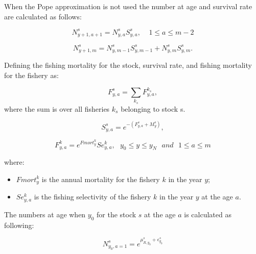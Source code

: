 \documentclass{article}
\begin{document}
When the Pope approximation is not used the number at age and survival rate are calculated as follows:

\begin{equation}
N^s_{y+1,a+1}=N^s_{y,a}S^s_{y,a}, \ \ \ \ \ 1\leq a \leq m-2
\end{equation}

\begin{equation}
N^s_{y+1,m}=N^s_{y,m-1}S^s_{y,m-1}+N^s_{y,m}S^s_{y,m}.
\end{equation}

Defining the fishing mortality for the stock, survival rate, and fishing mortality for the fishery as:

\begin{equation}
F^s_{y,a} = \sum_{k_s}F^{k_s}_{y,a}, 
\end{equation}
where the sum is over all fisheries $k_s$ belonging to stock s.

\begin{equation}
S^s_{y,a}=e^{-(F^s_{y,a}+M^{s}_{y})},
\end{equation}

\begin{equation}
F^k_{y,a}=e^{Fmort^k_y}Se^k_{y,a}, \ \ \ y_0\leq y \leq y_N \ \ \ and  \ \ \  1\leq a \leq m
\end{equation}

where:
\begin{itemize}

    
    \item $Fmort^k_y$ is the annual mortality for the fishery $k$ in the year $y$;
    \item $Se^k_{y,a}$ is the fishing selectivity of the fishery $k$ in the year $y$ at the age $a$.

\end{itemize}

\hfill

The numbers at age when $y_0$ for the stock $s$ at the age $a$ is calculated as following:

\begin{equation}
N^s_{y_0,a=1}=e^{\mu^s_{R,y_0} + \epsilon^s_{y_0}}
\end{equation}
\end{document}
